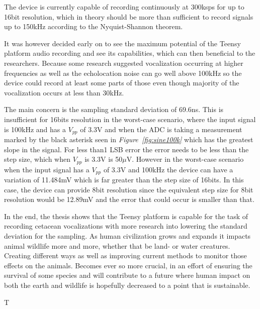 The device is currently capable of recording continuously at 300ksps for up to 16bit resolution, which in theory should be more than sufficient to record signals up to 150kHz according to the Nyquist-Shannon theorem.

It was however decided early on to see the maximum potential of the Teensy platform audio recording and see its capabilities, which can then beneficial to the researchers.
Because some research suggested vocalization occurring at higher frequencies as well as the echolocation noise can go well above 100kHz so the device could record at least some parts of those even though majority of the vocalization occurs at less than 30kHz.

The main concern is the sampling standard deviation of 69.6ns.
This is insufficient for 16bits resolution in the worst-case scenario,
where the input signal is 100kHz and has a $V_{pp}$ of 3.3V and when the ADC is taking a measurement marked by the black asterisk seen in \textit{Figure~\ref{fig:sine100k}} which has the greatest slope in the signal.
For less than1 LSB error the error needs to be less than the step size, which when $V_{pp}$ is 3.3V is 50$\mu$V.
However in the worst-case scenario when the input signal has a $V_{pp}$ of 3.3V and 100kHz the device can have a variation of 11.484mV which is far greater than the step size of 16bits.
In this case, the device can provide 8bit resolution since the equivalent step size for 8bit resolution would be 12.89mV and the error that could occur is smaller than that.

In the end, the thesis shows that the Teensy platform is capable for the task of recording cetacean vocalizations with more research into lowering the standard deviation for the sampling.
As human civilization grows and expands it impacts animal wildlife more and more, whether that be land- or water creatures.
Creating different ways as well as improving current methods to monitor those effects on the animals.
Becomes ever so more crucial, in an effort of ensuring the survival of some species and will contribute to a future where human impact on both the earth and wildlife is hopefully decreased to a point that is sustainable.


T

